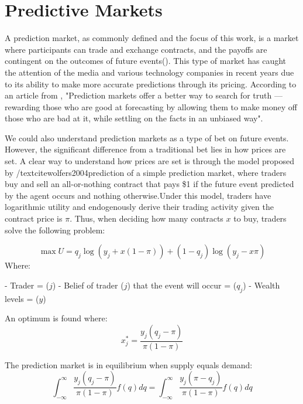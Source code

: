 \section{Predictive Markets}
\label{sec:predictive_markets}

A prediction market, as commonly defined and the focus of this work, is a market where participants can trade and exchange contracts, and the payoffs are contingent on the outcomes of future events(\citeauthor{wolfers2004prediction}). This type of market has caught the attention of the media and various technology companies in recent years due to its ability to make more accurate predictions through its pricing. According to an article from \textcite{roose2023wager}, "Prediction markets offer a better way to search for truth — rewarding those who are good at forecasting by allowing them to make money off those who are bad at it, while settling on the facts in an unbiased way".

We could also understand prediction markets as a type of bet on future events. However, the significant difference from a traditional bet lies in how prices are set. A clear way to understand how prices are set is through the model proposed by  /textcite{wolfers2004prediction}  of a simple prediction market, where traders buy and sell an all-or-nothing contract that pays  \$1 if the future event predicted by the agent occurs and nothing otherwise.Under this model, traders have logarithmic utility and endogenously derive their trading activity given the contract price is \( \pi \). Thus, when deciding how many contracts \( x \) to buy, traders solve the following problem:

\begin{equation}
    \max U = q_j \log(y_j + x(1 - \pi)) + (1 - q_j) \log(y_j - x\pi)
\end{equation}
Where:

- Trader = (\( j \))
- Belief of trader (\( j \)) that the event will occur = (\( q_j \))
- Wealth levels = (\( y \))

An optimum is found where:
\begin{equation}
    x_j^* = \frac{y_j(q_j - \pi)}{\pi(1 - \pi)}
\end{equation}

The prediction market is in equilibrium when supply equals demand:
\begin{equation}
    \int_{-\infty}^{\infty}\frac{y_j(q_j - \pi)}{\pi(1 - \pi)}f(q)dq = \int_{-\infty}^{\infty}\frac{y_j(\pi -q_j)}{\pi(1 - \pi)}f(q)dq
\end{equation}

